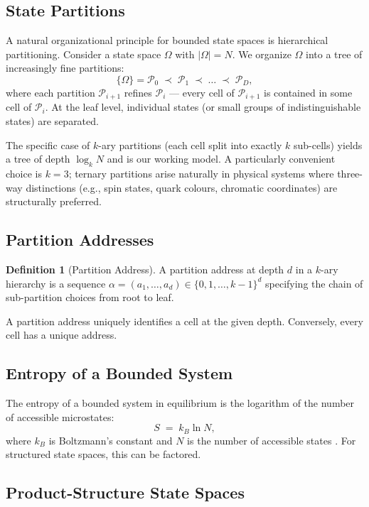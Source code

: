 \documentclass[11pt,a4paper]{article}
\theoremstyle{definition}
\newtheorem{definition}[theorem]{Definition}
\theoremstyle{remark}
\newcommand{\Pc}{\mathcal{P}}
\begin{document}
\subsection{State Partitions}

A natural organizational principle for bounded state spaces is hierarchical partitioning. Consider a state space $\Omega$ with $|\Omega| = N$. We organize $\Omega$ into a tree of increasingly fine partitions:
\[
\{\Omega\} = \Pc_0 \;\prec\; \Pc_1 \;\prec\; \ldots \;\prec\; \Pc_D,
\]
where each partition $\Pc_{i+1}$ refines $\Pc_i$ --- every cell of $\Pc_{i+1}$ is contained in some cell of $\Pc_i$. At the leaf level, individual states (or small groups of indistinguishable states) are separated.

The specific case of $k$-ary partitions (each cell split into exactly $k$ sub-cells) yields a tree of depth $\log_k N$ and is our working model. A particularly convenient choice is $k = 3$; ternary partitions arise naturally in physical systems where three-way distinctions (e.g., spin states, quark colours, chromatic coordinates) are structurally preferred.

\subsection{Partition Addresses}

\begin{definition}[Partition Address]
\label{def:address}
A partition address at depth $d$ in a $k$-ary hierarchy is a sequence $\alpha = (a_1, \ldots, a_d) \in \{0, 1, \ldots, k-1\}^d$ specifying the chain of sub-partition choices from root to leaf.
\end{definition}

A partition address uniquely identifies a cell at the given depth. Conversely, every cell has a unique address.

\subsection{Entropy of a Bounded System}

The entropy of a bounded system in equilibrium is the logarithm of the number of accessible microstates:
\[
S \;=\; k_B \ln N,
\]
where $k_B$ is Boltzmann's constant and $N$ is the number of accessible states \citep{boltzmann1872further}. For structured state spaces, this can be factored.

\subsection{Product-Structure State Spaces}
\end{document}

